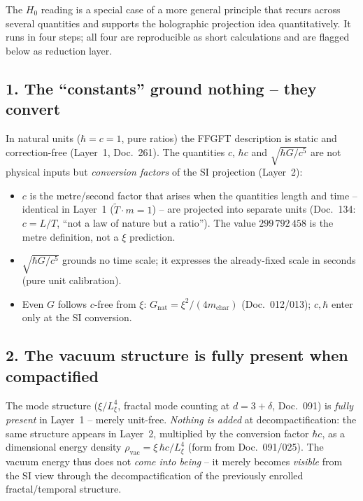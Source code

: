 The $H_0$ reading is a special case of a more general principle that recurs
across several quantities and supports the holographic projection idea
quantitatively. It runs in four steps; all four are reproducible as short
calculations and are flagged below as reduction layer.

\subsection*{1. The \enquote{constants} ground nothing -- they convert}

In natural units ($\hbar=c=1$, pure ratios) the FFGFT description is static
and correction-free (Layer~1, Doc.~261). The quantities $c$, $\hbar c$ and
$\sqrt{\hbar G/c^5}$ are not physical inputs but \emph{conversion factors} of
the SI projection (Layer~2):
\begin{itemize}
  \item $c$ is the metre/second factor that arises when the quantities length
        and time -- identical in Layer~1 ($\tilde T\cdot m=1$) -- are projected
        into separate units (Doc.~134: $c=L/T$, \enquote{not a law of nature
        but a ratio}). The value $299\,792\,458$ is the metre definition, not a
        $\xi$ prediction.
  \item $\sqrt{\hbar G/c^5}$ grounds no time scale; it expresses the
        already-fixed scale in seconds (pure unit calibration).
  \item Even $G$ follows $c$-free from $\xi$: $G_{\text{nat}}=\xi^2/(4m_{\text{char}})$
        (Doc.~012/013); $c,\hbar$ enter only at the SI conversion.
\end{itemize}

\subsection*{2. The vacuum structure is fully present when compactified}

The mode structure ($\xi/L_\xi^4$, fractal mode counting at $d=3+\delta$,
Doc.~091) is \emph{fully present} in Layer~1 -- merely unit-free. \emph{Nothing
is added} at decompactification: the same structure appears in Layer~2,
multiplied by the conversion factor $\hbar c$, as a dimensional energy density
$\rho_{\text{vac}}=\xi\,\hbar c/L_\xi^4$ (form from Doc.~091/025). The vacuum
energy thus does not \emph{come into being} -- it merely becomes \emph{visible}
from the SI view through the decompactification of the previously enrolled
fractal/temporal structure.

